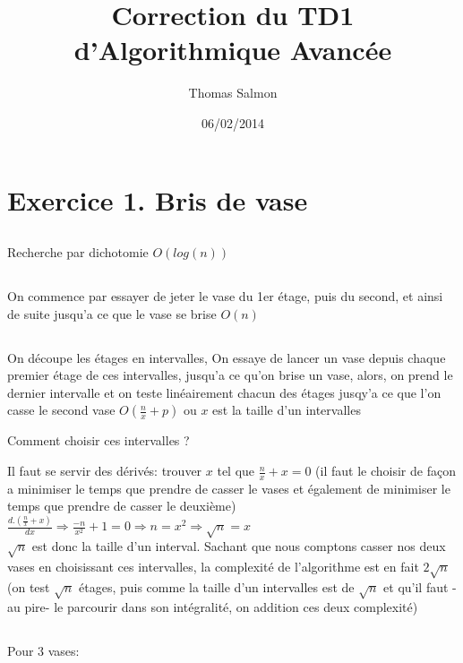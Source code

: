 \documentclass[a4paper]{article}
\title{Correction du TD1 d'Algorithmique Avancée}
\author{Thomas Salmon}
\date{06/02/2014}
\begin{document}
\maketitle
\section{Exercice 1. Bris de vase}
\subsection{}
Recherche par dichotomie $O(log(n))$
\subsection{}
On commence par essayer de jeter le vase du 1er étage, puis du second, et ainsi de suite jusqu'a ce que le vase se brise $O(n)$
\subsection{}
On découpe les étages en intervalles, On essaye de lancer un vase depuis chaque premier étage de ces intervalles, jusqu'a ce qu'on brise un vase, alors, on prend le dernier intervalle et on teste linéairement chacun des étages jusqy'a ce que l'on casse le second vase $O(\frac{n}{x}+p)$ ou $x$ est la taille d'un intervalles  

Comment choisir ces intervalles ? 

Il faut se servir des dérivés: trouver $x$ tel que $\frac{n}{x}+x = 0$ (il faut le choisir de façon a minimiser le temps que prendre de casser le vases et également de minimiser le temps que prendre de casser le deuxième) \\

\begin{math}
  \frac{d.(\frac{n}{x}+x)}{dx} \Rightarrow \frac{-n}{x^2} + 1 = 0 \Rightarrow n = x^2 \Rightarrow \sqrt{n} = x
\end{math}\\

$\sqrt{n}$ est donc la taille d'un interval. Sachant que nous comptons casser nos deux vases en choisissant ces intervalles, la complexité de l'algorithme est en fait $2\sqrt{n}$ (on test $\sqrt{n}$ étages, puis comme la taille d'un intervalles est de $\sqrt{n}$ et qu'il faut -au pire- le parcourir dans son intégralité, on addition ces deux complexité)
\subsection{}
Pour 3 vases:  
\end{document}
